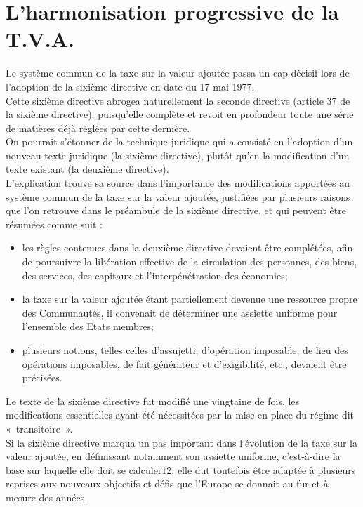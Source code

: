 \documentclass{book}
\begin{document}
\section{L'harmonisation progressive de la T.V.A.}

Le système commun de la taxe sur la valeur ajoutée passa un cap décisif lors de l'adoption de
la sixième directive en date du 17 mai 1977.\\

Cette sixième directive abrogea naturellement la seconde directive (article 37 de la sixième
directive), puisqu'elle complète et revoit en profondeur toute une série de matières déjà
réglées par cette dernière.\\

On pourrait s'étonner de la technique juridique qui a consisté en l'adoption d'un nouveau texte
juridique (la sixième directive), plutôt qu’en la modification d'un texte existant (la deuxième
directive).\\

L'explication trouve sa source dans l'importance des modifications apportées au système
commun de la taxe sur la valeur ajoutée, justifiées par plusieurs raisons que l'on retrouve dans
le préambule de la sixième directive, et qui peuvent être résumées comme suit :\\

\begin{itemize}
\item les règles contenues dans la deuxième directive devaient être complétées, afin de
poursuivre la libération effective de la circulation des personnes, des biens, des
services, des capitaux et l'interpénétration des économies;
\item la taxe sur la valeur ajoutée étant partiellement devenue une ressource propre des
Communautés, il convenait de déterminer une assiette uniforme pour l'ensemble
des Etats membres;
\item plusieurs notions, telles celles d'assujetti, d'opération imposable, de lieu des
opérations imposables, de fait générateur et d'exigibilité, etc., devaient être
précisées.
\end{itemize}

\null

Le texte de la sixième directive fut modifié une vingtaine de fois, les modifications
essentielles ayant été nécessitées par la mise en place du régime dit «~transitoire~».\\

Si la sixième directive marqua un pas important dans l'évolution de la taxe sur la valeur
ajoutée, en définissant notamment son assiette uniforme, c'est-à-dire la base sur laquelle elle
doit se calculer12, elle dut toutefois être adaptée à plusieurs reprises aux nouveaux objectifs et
défis que l'Europe se donnait au fur et à mesure des années.\\
\end{document}
